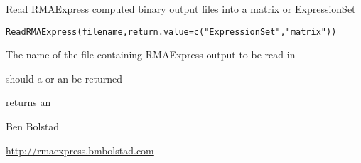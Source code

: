 \begin{Description}\relax
Read RMAExpress computed binary output files into a matrix
or ExpressionSet
\end{Description}
\begin{Usage}
\begin{verbatim}
ReadRMAExpress(filename,return.value=c("ExpressionSet","matrix"))
\end{verbatim}
\end{Usage}
\begin{Arguments}
\begin{ldescription}
\item[\code{filename}] The name of the file containing RMAExpress output to
be read in
\item[\code{return.value}] should a  or an  be returned
\end{ldescription}
\end{Arguments}
\begin{Value}
returns an 
\end{Value}
\begin{Author}\relax
Ben Bolstad 
\end{Author}
\begin{References}\relax
\url{http://rmaexpress.bmbolstad.com}
\end{References}

